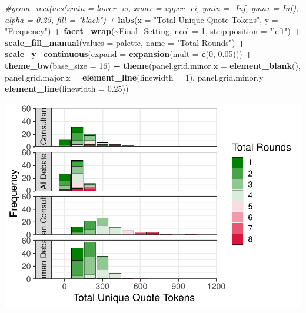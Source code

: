 \documentclass[
]{article}
\newenvironment{Shaded}{\begin{snugshade}}{\end{snugshade}}
\newcommand{\AttributeTok}[1]{\textcolor[rgb]{0.13,0.29,0.53}{#1}}
\newcommand{\CommentTok}[1]{\textcolor[rgb]{0.56,0.35,0.01}{\textit{#1}}}
\newcommand{\DecValTok}[1]{\textcolor[rgb]{0.00,0.00,0.81}{#1}}
\newcommand{\FloatTok}[1]{\textcolor[rgb]{0.00,0.00,0.81}{#1}}
\newcommand{\FunctionTok}[1]{\textcolor[rgb]{0.13,0.29,0.53}{\textbf{#1}}}
\newcommand{\NormalTok}[1]{#1}
\newcommand{\SpecialCharTok}[1]{\textcolor[rgb]{0.81,0.36,0.00}{\textbf{#1}}}
\newcommand{\StringTok}[1]{\textcolor[rgb]{0.31,0.60,0.02}{#1}}
\begin{document}
\begin{Shaded}
\begin{Highlighting}[]
  \CommentTok{\#geom\_rect(aes(xmin = lower\_ci, xmax = upper\_ci, ymin = {-}Inf, ymax = Inf), alpha = 0.25, fill = "black") +}
  \FunctionTok{labs}\NormalTok{(}\AttributeTok{x =} \StringTok{"Total Unique Quote Tokens"}\NormalTok{, }
       \AttributeTok{y =} \StringTok{"Frequency"}\NormalTok{) }\SpecialCharTok{+}
  \FunctionTok{facet\_wrap}\NormalTok{(}\SpecialCharTok{\textasciitilde{}}\NormalTok{Final\_Setting, }\AttributeTok{ncol =} \DecValTok{1}\NormalTok{, }\AttributeTok{strip.position =} \StringTok{"left"}\NormalTok{) }\SpecialCharTok{+}
  \FunctionTok{scale\_fill\_manual}\NormalTok{(}\AttributeTok{values =}\NormalTok{ palette, }\AttributeTok{name =} \StringTok{"Total Rounds"}\NormalTok{) }\SpecialCharTok{+}
  \FunctionTok{scale\_y\_continuous}\NormalTok{(}\AttributeTok{expand =} \FunctionTok{expansion}\NormalTok{(}\AttributeTok{mult =} \FunctionTok{c}\NormalTok{(}\DecValTok{0}\NormalTok{, }\FloatTok{0.05}\NormalTok{))) }\SpecialCharTok{+}
  \FunctionTok{theme\_bw}\NormalTok{(}\AttributeTok{base\_size =} \DecValTok{16}\NormalTok{) }\SpecialCharTok{+}
  \FunctionTok{theme}\NormalTok{(}\AttributeTok{panel.grid.minor.x =} \FunctionTok{element\_blank}\NormalTok{(),}
        \AttributeTok{panel.grid.major.x =} \FunctionTok{element\_line}\NormalTok{(}\AttributeTok{linewidth =} \DecValTok{1}\NormalTok{),}
        \AttributeTok{panel.grid.minor.y =} \FunctionTok{element\_line}\NormalTok{(}\AttributeTok{linewidth =} \FloatTok{0.25}\NormalTok{))}
\end{Highlighting}
\end{Shaded}

\includegraphics[width=1\linewidth]{debate-2309_files/figure-latex/rounds graph-2}
\end{document}
